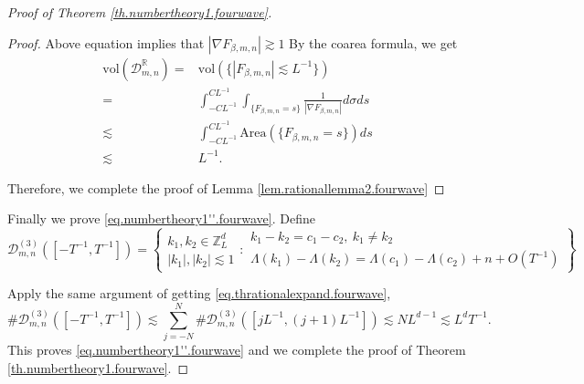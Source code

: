 \begin{proof}[Proof of Theorem \ref{th.numbertheory1.fourwave}]
\begin{proof}
Above equation implies that $|\nabla F_{\beta,m,n}|\gtrsim 1$ By the coarea formula, we get
\begin{equation}
\begin{split}
    \text{vol}(\mathcal{D}^{\mathbb{R}}_{m,n}) =&  \text{vol}(\{|F_{\beta,m,n}|\lesssim L^{-1}\})
    \\
    =& \int^{CL^{-1}}_{-CL^{-1}} \int_{\{F_{\beta,m,n}=s\}}\frac{1}{|\nabla F_{\beta,m,n}|}d\sigma ds
    \\
    \lesssim& \int^{CL^{-1}}_{-CL^{-1}} \text{Area}(\{F_{\beta,m,n}=s\}) ds
    \\
    \lesssim& L^{-1}.
\end{split}
\end{equation}


Therefore, we complete the proof of Lemma \ref{lem.rationallemma2.fourwave}

\end{proof}

Finally we prove \eqref{eq.numbertheory1''.fourwave}. Define
\begin{equation}
    \mathcal{D}^{(3)}_{m,n}([-T^{-1},T^{-1} ])=\left\{\begin{matrix}
k_1,k_2\in\mathbb{Z}_L^d \\
|k_1|, |k_2|\lesssim 1
\end{matrix}
:
\begin{matrix}
k_1- k_2=c_1- c_{2},\ k_1\ne k_2 \\
\Lambda(k_1)-\Lambda(k_2)=\Lambda(c_1)- \Lambda(c_2)+n+O(T^{-1})
\end{matrix}
\right\}
\end{equation}

Apply the same argument of getting \eqref{eq.thrationalexpand.fourwave},
\begin{equation}
    \#\mathcal{D}^{(3)}_{m,n}([-T^{-1},T^{-1} ])\lesssim \sum_{j=-N}^N\#\mathcal{D}^{(3)}_{m,n}([jL^{-1}, (j+1)L^{-1}])\lesssim NL^{d-1}\lesssim L^dT^{-1}.
\end{equation}
This proves \eqref{eq.numbertheory1''.fourwave} and we complete the proof of Theorem \ref{th.numbertheory1.fourwave}.
\end{proof}



